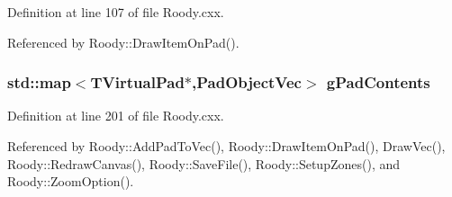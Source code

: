 Definition at line 107 of file Roody.cxx.



Referenced by Roody::DrawItemOnPad().

\subsubsection[{gPadContents}]{\setlength{\rightskip}{0pt plus 5cm}std::map$<$TVirtualPad$\ast$,{\bf PadObjectVec}$>$ {\bf gPadContents}}\label{Roody_8cxx_aaa13e34ee096e30cf2cc881c4ef61afe}


Definition at line 201 of file Roody.cxx.



Referenced by Roody::AddPadToVec(), Roody::DrawItemOnPad(), DrawVec(), Roody::RedrawCanvas(), Roody::SaveFile(), Roody::SetupZones(), and Roody::ZoomOption().

